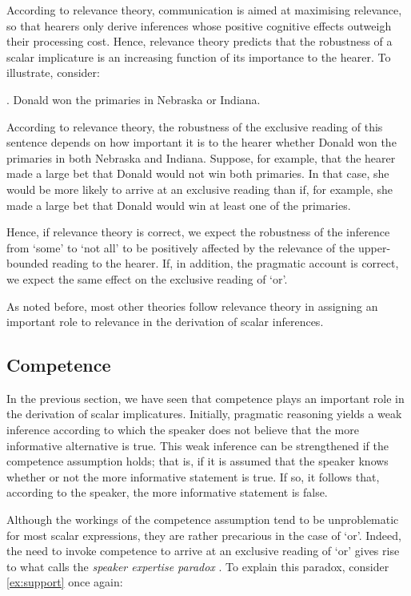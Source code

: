 \documentclass[12pt]{article}
\begin{document}
According to relevance theory, communication is aimed at maximising relevance, so that hearers only derive inferences whose positive cognitive effects outweigh their processing cost. Hence, relevance theory predicts that the robustness of a scalar implicature is an increasing function of its importance to the hearer. To illustrate, consider:

\ex.	Donald won the primaries in Nebraska or Indiana.

According to relevance theory, the robustness of the exclusive reading of this sentence depends on how important it is to the hearer whether Donald won the primaries in both Nebraska and Indiana. Suppose, for example, that the hearer made a large bet that Donald would not win both primaries. In that case, she would be more likely to arrive at an exclusive reading than if, for example, she made a large bet that Donald would win at least one of the primaries.

Hence, if relevance theory is correct, we expect the robustness of the inference from `some' to `not all' to be positively affected by the relevance of the upper-bounded reading to the hearer. If, in addition, the pragmatic account is correct, we expect the same effect on the exclusive reading of `or'.

As noted before, most other theories follow relevance theory in assigning an important role to relevance in the derivation of scalar inferences. 

\subsection*{Competence}

In the previous section, we have seen that competence plays an important role in the derivation of scalar implicatures. Initially, pragmatic reasoning yields a weak inference according to which the speaker does not believe that the more informative alternative is true. This weak inference can be strengthened if the competence assumption holds; that is, if it is assumed that the speaker knows whether or not the more informative statement is true. If so, it follows that, according to the speaker, the more informative statement is false.

Although the workings of the competence assumption tend to be unproblematic for most scalar expressions, they are rather precarious in the case of `or'. Indeed, the need to invoke competence to arrive at an exclusive reading of `or' gives rise to what \citet{zondervan2010} calls the \emph{speaker expertise paradox} \citep[cf.][]{geurts2006}. To explain this paradox, consider \ref{ex:support} once again:
\end{document}
